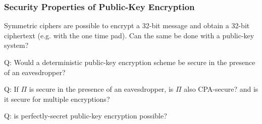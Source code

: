 \begin{frame}\frametitle{Security Properties of Public-Key Encryption}
\begin{exampleblock}{} Symmetric ciphers are possible to encrypt a 32-bit message and obtain a 32-bit ciphertext (e.g. with the one time pad). Can the same be done with a public-key system?
\end{exampleblock}
\begin{theorem}
\alert{Q: Would a deterministic public-key encryption scheme be secure in the presence of an eavesdropper?}
\end{theorem}
\begin{proposition}
\alert{Q: If $\Pi$ is secure in the presence of an eavesdropper, is $\Pi$ also CPA-secure? and is it secure for multiple encryptions?}
\end{proposition}
\begin{proposition}
\alert{Q: is perfectly-secret public-key encryption possible?}
\end{proposition}
\end{frame}

